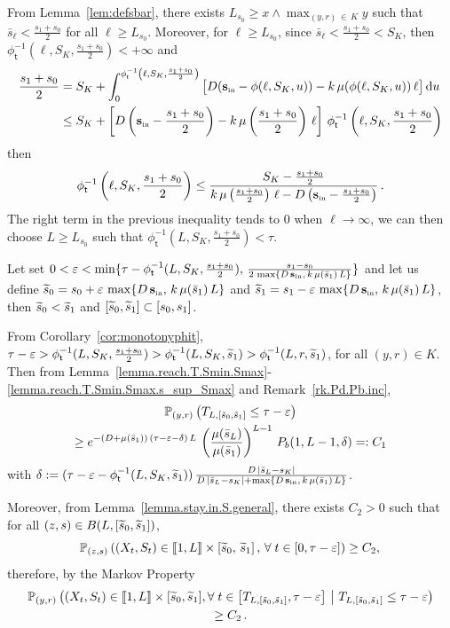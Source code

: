 \documentclass[10pt]{amsart}
\theoremstyle{definition}\newtheorem{defi}[theo]{Definition}\newtheorem{rema}[theo]{Remark}\newtheorem{exam}[theo]{Example}\newtheorem{exem}[theo]{Example}\newtheorem{nota}[theo]{Notation}
\newcommand{\llbracket}{\mathopen{[\mkern -2.7mu[}}
\newcommand{\rrbracket}{\mathclose{]\mkern -2.7mu]}}
\newcommand{\PP}{\mathbb{P}}
\newcommand{\Sin}{{\mathbf s}_{\textrm{\tiny\rm in}}}
\newcommand{\dif}{\mathrm{d}}
\newcommand{\barmu}{\mu(\bar s_1)}
\newcommand{\phit}{\phi_\textsf{t}^{-1}}
\newcommand{\1}{\mathbf{1}}
\let\oldtilde\tilde
\renewcommand*{\tilde}[1]{\mathchoice{\widetilde{#1}}{\widetilde{#1}}{\oldtilde{#1}}{\oldtilde{#1}}}
\let\oldforall\forall
\renewcommand*{\forall}{\mathrel{\oldforall}}
\begin{document}
From Lemma~\ref{lem:defsbar}, there exists $L_{s_0} \geq x\wedge \max_{(y,r)\,\in\,K}y$ such that $\bar s_\ell <\frac{s_1+s_0}{2}$ for all $\ell \geq L_{s_0}$. Moreover, for $\ell \geq L_{s_0}$, since $\bar s_\ell<\frac{s_1+s_0}{2}<S_K$, then $\phit(\ell,S_K, \frac{s_1+s_0}{2})<+\infty$ and
\begin{align*}
\frac{s_1+s_0}{2} &= S_K + \int_0^{\phit\left(\ell,S_K, \frac{s_1+s_0}{2}\right)}
\big[D(\Sin-\phi(\ell,S_K,u))-k\,\mu(\phi(\ell,S_K,u))\,\ell\big]\,\dif u
\\
&\leq S_K +
\left[D\left(\Sin-\frac{s_1+s_0}{2}\right)-k\,\mu\left(\frac{s_1+s_0}{2}\right)\,\ell\right]\,\phit\left(\ell,S_K, \frac{s_1+s_0}{2}\right)
\end{align*}
then
\[
\phit\left(\ell,S_K, \frac{s_1+s_0}{2}\right)
\leq \frac{S_K-\frac{s_1+s_0}{2}}{k\,\mu\left(\frac{s_1+s_0}{2}\right)\,\ell-D\left(\Sin-\frac{s_1+s_0}{2}\right)}\,.
\]
The right term in the previous inequality tends to 0 when $\ell \to \infty$, we can then choose $L \geq L_{s_0}$ such that $\phit(L,S_K,  \frac{s_1+s_0}{2}) <\tau$.


Let set $0<\varepsilon<\min\{\tau-\phit(L,S_K, \frac{s_1+s_0}{2}),\,\frac{s_1-s_0}{2\,\max\{D\,\Sin,\, k\,\barmu\, L\}}\}$ and let us define $\tilde s_0 = s_0+\varepsilon\,\max\{D\,\Sin,\, k\,\barmu\, L\}$ and $\tilde s_1 = s_1-\varepsilon\,\max\{D\,\Sin,\, k\,\barmu\, L\}$, then $\tilde s_0<\tilde s_1$ and $[\tilde s_0, \tilde s_1] \subset [s_0,s_1]$.
 
From Corollary~\ref{cor:monotonyphit}, $\tau-\varepsilon>\phit(L,S_K, \frac{s_1+s_0}{2})>\phit(L,S_K, \tilde s_1)>\phit(L,r, \tilde s_1)$, for all $(y,r)\in K$. Then from Lemma~\ref{lemma.reach.T.Smin.Smax}-\ref{lemma.reach.T.Smin.Smax.s_sup_Smax} and Remark~\ref{rk.Pd.Pb.inc},
\begin{multline}\label{lemma.reach.small.substrate.proba1}
\PP_{(y,r)}\left(T_{L,[\tilde s_0,\tilde s_1]}\leq \tau-\varepsilon\right) \\
\geq e^{-(D+\barmu)\,(\tau-\varepsilon-\delta)\,L}\,
\left(\frac{\mu(\bar s_L)}{\barmu}\right)^{L-1}\,P_b(1,L-1, \delta)=:C_1
\end{multline}
with $\delta:=(\tau-\varepsilon-\phit(L, S_K,\tilde s_1))\,\frac{D\,|\bar s_L-s_K|}{D\,|\bar s_{L}-s_K|+\max\{D\,\Sin,\,k\,\barmu\,L\}}$.

Moreover, from Lemma~\ref{lemma.stay.in.S.general}, there exists $C_2>0$ such that for all $(z,s)\in\linebreak B(L, [\tilde s_0,\tilde s_1])$,
\[
\PP_{(z,s)}\left((X_t,S_t) \in \llbracket 1,L\rrbracket \times \left[\tilde s_0, \, \tilde s_1\right],\,
\forall t\in[0,\tau-\varepsilon]\right)\geq C_2,\,
\]
therefore, by the Markov Property
\begin{multline}\label{lemma.reach.small.substrate.proba2}
\PP_{(y,r)}
\left((X_t,S_t)\in \llbracket 1, L \rrbracket \times [\tilde s_0,\tilde s_1],
\forall t\in \left[T_{ L,[\tilde s_0,\tilde s_1]},\tau-\varepsilon\right] \ \middle| \ T_{ L,[\tilde s_0,\tilde s_1]}
\leq \tau-\varepsilon\right)
\\ \geq C_2\,.
\end{multline}
\end{document}
